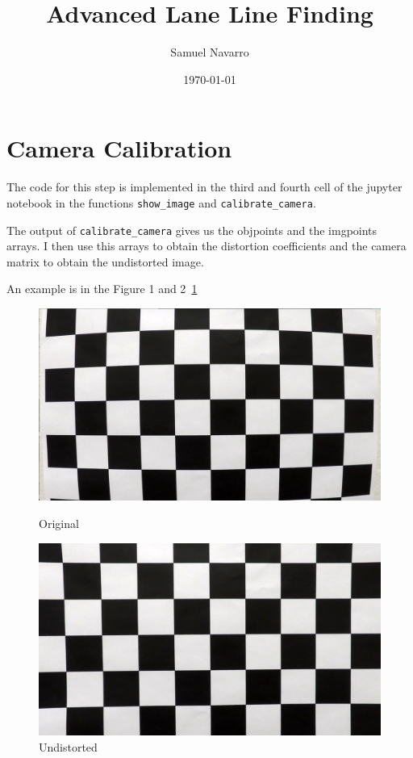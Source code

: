 \documentclass[11pt, a4paper]{article}
\title{Advanced Lane Line Finding}
\author{Samuel Navarro}
\date{\today}
\begin{document}
\maketitle

\tableofcontents{}



\section{Camera Calibration}
\label{sec:camera_calibration}

The code for this step is implemented in the third and fourth cell of the jupyter notebook in the functions \texttt{show\_image} and \texttt{calibrate\_camera}. 

The output of \texttt{calibrate\_camera} gives us the objpoints and the imgpoints arrays. I then use this arrays to obtain the distortion coefficients and the camera matrix to obtain the undistorted image. 

An example is in the Figure 1 and 2~\ref{fig:undistort} 


\begin{figure}[htb!]
    \centering
    \begin{minipage}{0.5\textwidth}
        \centering
		\includegraphics[width=1\textwidth]{chess_img} 
        \caption{Original}
		\label{fig:original_chess}
    \end{minipage}\hfill
    \begin{minipage}{0.5\textwidth}
        \centering
		\includegraphics[width=1\textwidth]{undistorted_chess} 
        \caption{Undistorted}
		\label{fig:undistorted_chess}
    \end{minipage}
	\label{fig:undistort}
\end{figure}
\end{document}
